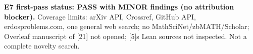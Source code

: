 \documentclass[
]{article}
\begin{document}
\textbf{E7 first-pass status: PASS with MINOR findings (no attribution
blocker).} Coverage limits: arXiv API, Crossref, GitHub API,
erdosproblems.com, one general web search; no MathSciNet/zbMATH/Scholar;
Overleaf manuscript of {[}21{]} not opened; {[}5{]}\textquotesingle s
Lean sources not inspected. Not a complete novelty search.
\end{document}
